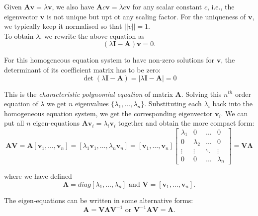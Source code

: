\documentclass[10pt,b5paper,titlepage]{book}
\begin{document}
Given $\mathbf{A}\mathbf{v}=\lambda\mathbf{v}$, we also have $\mathbf{A}c\mathbf{v}=\lambda{}c\mathbf{v}$ for any scalar constant $c$, i.e., the eigenvector $\mathbf{v}$ is not unique but upt ot any scaling factor. For the uniqueness of $\mathbf{v}$, we typically keep it normalised so that $||v|| = 1$.\\

To obtain $\lambda$, we rewrite the above equation as
\begin{equation}
(\lambda\mathbf{I}-\mathbf{A})\mathbf{v}=0
.\end{equation}

For this homogeneous equation system to have non-zero solutions for $\mathbf{v}$, the determinant of its coefficient matrix has to be zero:
\begin{equation}
\det{(\lambda\mathbf{I}-\mathbf{A})}=|\lambda\mathbf{I}-\mathbf{A}|=0
\end{equation}

This is the \textit{characteristic polynomial equation} of matrix $\mathbf{A}$. Solving this $n^{th}$ order equation of $\lambda$ we get $n$ eigenvalues $\{\lambda_{1},\dots,\lambda_{n}\}$. Substituting each $\lambda{}_{i}$ back into the homogeneous equation system, we get the corresponding eigenvector $\mathbf{v}_{i}$. We can put all $n$ eigen-equations $\mathbf{A}\mathbf{v}_{i}=\lambda{}_{i}\mathbf{v}_{i}$ together and obtain the more compact form:
\begin{equation}
\mathbf{A}\mathbf{V} = \mathbf{A}[\mathbf{v}_{1},\dots,\mathbf{v}_{n}] = [\lambda{}_{1}\mathbf{v}_{1},\dots,\lambda{}_{n}\mathbf{v}_{n}] = 
[\mathbf{v}_{1},\dots,\mathbf{v}_{n}]\begin{bmatrix}
\lambda{}_{1} & 0 & \dots & 0\\
0 & \lambda{}_{2} & \dots & 0\\
\vdots & \vdots & \ddots & \vdots\\
0 & 0 & \dots & \lambda{}_{n}
\end{bmatrix}
= \mathbf{V}\mathbf{\Lambda{}}
\end{equation}

where we have defined
\begin{equation}
\mathbf{\Lambda{}} = \mathit{diag}[\lambda{}_{1},\dots,\lambda{}_{n}] \text{ and } \mathbf{V} = [\mathbf{v}_{1},\dots,\mathbf{v}_{n}]
.\end{equation}

The eigen-equations can be written in some alternative forms:
\begin{equation}
\mathbf{A} = \mathbf{V}\mathbf{\Lambda{}}\mathbf{V}^{-1} \text{ or } \mathbf{V}^{-1}\mathbf{A}\mathbf{V} = \mathbf{\Lambda}
.\end{equation}
\end{document}
